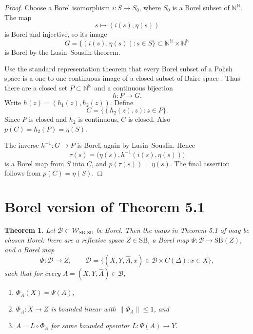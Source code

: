 \documentclass[11pt]{article}
\newtheorem{theorem}{Theorem}
\newcommand{\N}{\mathbb{N}}
\newcommand{\SB}{\mathrm{SB}}
\newcommand{\SD}{\mathrm{SD}}
\newcommand{\cB}{\mathcal{B}}
\newcommand{\cD}{\mathcal{D}}
\newcommand{\cW}{\mathcal{W}}
\begin{document}
\begin{proof}
Choose a Borel isomorphism $i:S\to S_0$, where $S_0$ is a Borel subset of
$\N^\N$. The map
\[
   s\mapsto (i(s),\eta(s))
\]
is Borel and injective, so its image
\[
   G=\{(i(s),\eta(s)):s\in S\}\subset\N^\N\times\N^\N
\]
is Borel by the Lusin--Souslin theorem.

Use the standard representation theorem that every Borel subset of a Polish
space is a one-to-one continuous image of a closed subset of Baire space
\cite[Theorem 13.7]{Kechris}. Thus there are a closed set
$P\subset\N^\N$ and a continuous bijection
\[
   h:P\to G.
\]
Write $h(z)=(h_1(z),h_2(z))$. Define
\[
   C=\{(h_2(z),z):z\in P\}.
\]
Since $P$ is closed and $h_2$ is continuous, $C$ is closed. Also
$p(C)=h_2(P)=\eta(S)$.

The inverse $h^{-1}:G\to P$ is Borel, again by Lusin--Souslin. Hence
\[
   \tau(s)=\bigl(\eta(s),h^{-1}(i(s),\eta(s))\bigr)
\]
is a Borel map from $S$ into $C$, and $p(\tau(s))=\eta(s)$. The final assertion
follows from $p(C)=\eta(S)$.
\end{proof}

\section*{Borel version of Theorem 5.1}

\begin{theorem}\label{thm:borel-factor-subspaces}
Let $\cB\subset \cW_{\SB,\SD}$ be Borel. Then the maps in Theorem 5.1 of
\cite{AntunesBeanlandBraga} may be chosen Borel: there are a reflexive
space $Z\in\SB$, a Borel map $\Psi:\cB\to\SB(Z)$, and a Borel map
\[
   \Phi:\cD\to Z,\qquad
   \cD=\{(X,Y,\widehat A,x)\in\cB\times C(\Delta):x\in X\},
\]
such that for every $A=(X,Y,\widehat A)\in\cB$,
\begin{enumerate}
\item $\Phi_A(X)=\Psi(A)$,
\item $\Phi_A:X\to Z$ is bounded linear with $\|\Phi_A\|\le 1$, and
\item $A=L\circ\Phi_A$ for some bounded operator $L:\Psi(A)\to Y$.
\end{enumerate}
\end{theorem}
\end{document}
